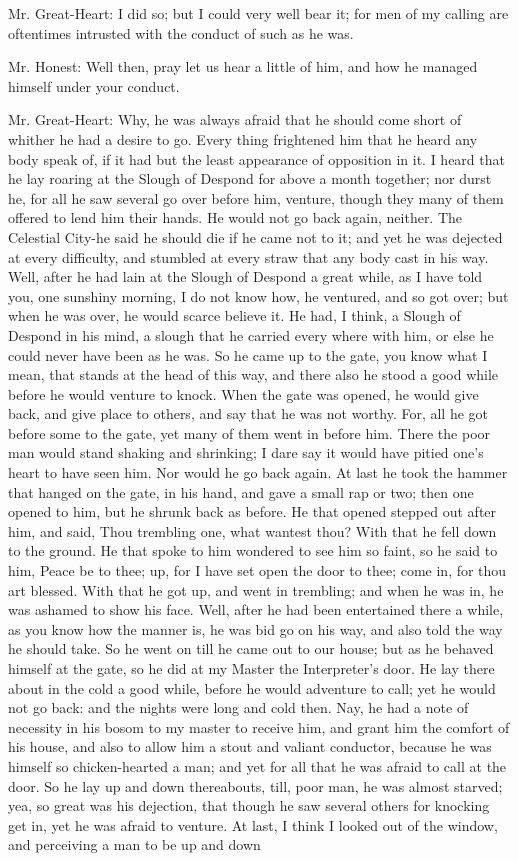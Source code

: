Mr. Great-Heart: I did so; but I could very well bear it; for men of my calling are oftentimes intrusted with the conduct of such as he was.

Mr. Honest: Well then, pray let us hear a little of him, and how he managed himself under your conduct.

Mr. Great-Heart: Why, he was always afraid that he should come short of whither he had a desire to go. Every thing frightened him that he heard any body speak of, if it had but the least appearance of opposition in it. I heard that he lay roaring at the Slough of Despond for above a month together; nor durst he, for all he saw several go over before him, venture, though they many of them offered to lend him their hands. He would not go back again, neither. The Celestial City-he said he should die if he came not to it; and yet he was dejected at every difficulty, and stumbled at every straw that any body cast in his way. Well, after he had lain at the Slough of Despond a great while, as I have told you, one sunshiny morning, I do not know how, he ventured, and so got over; but when he was over, he would scarce believe it. He had, I think, a Slough of Despond in his mind, a slough that he carried every where with him, or else he could never have been as he was. So he came up to the gate, you know what I mean, that stands at the head of this way, and there also he stood a good while before he would venture to knock. When the gate was opened, he would give back, and give place to others, and say that he was not worthy. For, all he got before some to the gate, yet many of them went in before him. There the poor man would stand shaking and shrinking; I dare say it would have pitied one's heart to have seen him. Nor would he go back again. At last he took the hammer that hanged on the gate, in his hand, and gave a small rap or two; then one opened to him, but he shrunk back as before. He that opened stepped out after him, and said, Thou trembling one, what wantest thou? With that he fell down to the ground. He that spoke to him wondered to see him so faint, so he said to him, Peace be to thee; up, for I have set open the door to thee; come in, for thou art blessed. With that he got up, and went in trembling; and when he was in, he was ashamed to show his face. Well, after he had been entertained there a while, as you know how the manner is, he was bid go on his way, and also told the way he should take. So he went on till he came out to our house; but as he behaved himself at the gate, so he did at my Master the Interpreter's door. He lay there about in the cold a good while, before he would adventure to call; yet he would not go back: and the nights were long and cold then. Nay, he had a note of necessity in his bosom to my master to receive him, and grant him the comfort of his house, and also to allow him a stout and valiant conductor, because he was himself so chicken-hearted a man; and yet for all that he was afraid to call at the door. So he lay up and down thereabouts, till, poor man, he was almost starved; yea, so great was his dejection, that though he saw several others for knocking get in, yet he was afraid to venture. At last, I think I looked out of the window, and perceiving a man to be up and down 